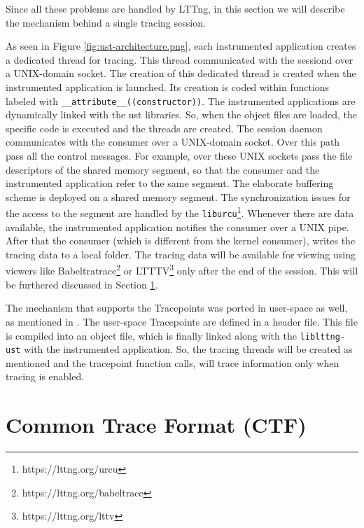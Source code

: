 Since all these problems are handled by LTTng, in this section we will describe
the mechanism behind a single tracing session.


As seen in Figure \ref{fig:ust-architecture.png}, each instrumented application
creates a dedicated thread for tracing. This thread communicated with the
sessiond over a UNIX-domain socket. The creation of this dedicated thread is
created when the instrumented application is launched. Its creation is coded
within functions labeled with \texttt{\_\_attribute\_\_((constructor))}. The
instrumented applications are dynamically linked with the ust libraries. So,
when the object files are loaded, the specific code is executed and the threads
are created. The session daemon communicates with the consumer over a
UNIX-domain socket. Over this path pass all the control messages. For example,
over these UNIX sockets pass the file descriptors of the shared memory segment,
so that the consumer and the instrumented application refer to the same segment.
The elaborate buffering scheme is deployed on a shared memory segment. The
synchronization issues for the access to the segment are handled by the
\texttt{liburcu}\footnote{https://lttng.org/urcu}. Whenever there are data
available, the instrumented application notifies the consumer over a UNIX pipe.
After that the consumer (which is different from the kernel consumer), writes
the tracing data to a local folder. The tracing data will be available for
viewing using viewers like Babeltratrace\footnote{https://lttng.org/babeltrace}
or LTTTV\footnote{https://lttng.org/lttv} only after the end of the session.
This will be furthered discussed in Section \ref{sec:ctf}.

The mechanism that supports the Tracepoints was ported in user-space as well, as
mentioned in \cite{userspace-markers}. The user-space Tracepoints are defined in
a header file. This file is compiled into an object file, which is finally
linked along with the \texttt{liblttng-ust} with the instrumented application.
So, the tracing threads will be created as mentioned and the tracepoint function
calls, will trace information only when tracing is enabled.

\section{Common Trace Format (CTF)}\label{sec:ctf}

